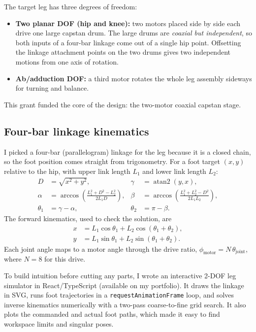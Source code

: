 \documentclass[11pt]{article}
\begin{document}
The target leg has three degrees of freedom:
\begin{itemize}
  \item \textbf{Two planar DOF (hip and knee):} two motors placed side by side
        each drive one large capstan drum. The large drums are
        \emph{coaxial but independent}, so both inputs of a four-bar linkage
        come out of a single hip point. Offsetting the linkage attachment
        points on the two drums gives two independent motions from one axis of
        rotation.
  \item \textbf{Ab/adduction DOF:} a third motor rotates the whole leg assembly
        sideways for turning and balance.
\end{itemize}
This grant funded the core of the design: the two-motor coaxial capstan stage.

\subsection{Four-bar linkage kinematics}

I picked a four-bar (parallelogram) linkage for the leg because it is a closed
chain, so the foot position comes straight from trigonometry. For a foot target
$(x,y)$ relative to the hip, with upper link length $L_1$ and lower link length
$L_2$:
\begin{align}
  D        &= \sqrt{x^2 + y^2}, &
  \gamma   &= \operatorname{atan2}(y, x), \\
  \alpha   &= \arccos\!\left(\frac{L_1^2 + D^2 - L_2^2}{2 L_1 D}\right), &
  \beta    &= \arccos\!\left(\frac{L_1^2 + L_2^2 - D^2}{2 L_1 L_2}\right), \\
  \theta_1 &= \gamma - \alpha, &
  \theta_2 &= \pi - \beta .
\end{align}
The forward kinematics, used to check the solution, are
\begin{align}
  x &= L_1\cos\theta_1 + L_2\cos(\theta_1+\theta_2), \\
  y &= L_1\sin\theta_1 + L_2\sin(\theta_1+\theta_2).
\end{align}
Each joint angle maps to a motor angle through the drive ratio,
$\phi_{\text{motor}} = N\,\theta_{\text{joint}}$, where $N = 8$ for this drive.

To build intuition before cutting any parts, I wrote an interactive 2-DOF leg
simulator in React/TypeScript (available on my portfolio). It draws the linkage
in SVG, runs foot trajectories in a \texttt{requestAnimationFrame} loop, and
solves inverse kinematics numerically with a two-pass coarse-to-fine grid
search. It also plots the commanded and actual foot paths, which made it easy
to find workspace limits and singular poses.
\end{document}
